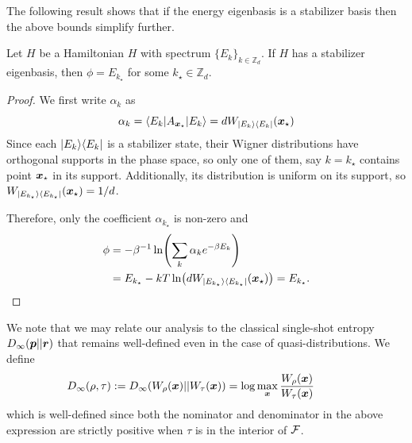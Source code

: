 \documentclass[pra,
aps,
twocolumn,
superscriptaddress,
groupedaddress,
nofootinbib,
reprint
]{revtex4-1}
\begin{document}
The following result shows that if the energy eigenbasis is a stabilizer basis then the above bounds simplify further.
\begin{proposition} \label{sharp-phi}
	Let $H$ be a Hamiltonian $H$ with spectrum $\{E_k\}_{k \in \mathbb{Z}_d}$.
	If $H$ has a stabilizer eigenbasis, then $\phi = E_{k_{\star}}$ for some $k_{\star} \in \mathbb{Z}_d$.
\end{proposition}
\begin{proof}
	We first write $\alpha_k$ as
\begin{equation}
	\alpha_k = \langle E_k | A_{\bm{x}_{\star}} |E_k\rangle = d W_{|E_k\rangle\langle E_k|}(\bm{x}_{\star})
\end{equation}
Since each $|E_k\rangle\langle E_k|$ is a stabilizer state, their Wigner distributions have orthogonal supports in the phase space, so only one of them, say $k = k_{\star}$ contains point $\bm{x}_{\star}$ in its support. 
Additionally, its distribution is uniform on its support, so $W_{|E_{k_\star}\rangle\langle E_{k_\star}|}(\bm{x}_{\star}) = 1/d$.

Therefore, only the coefficient $\alpha_{k_{\star}}$ is non-zero and
\begin{align}
\phi &= -\beta^{-1}\ln (\sum_k \alpha_k e^{-\beta E_k}) \nonumber \\
&=E_{k_{\star}} -kT \ln (d W_{|E_{k_\star}\rangle\langle E_{k_\star}|}(\bm{x}_{\star})) =E_{k_{\star}}.
\end{align}

\end{proof}

We note that we may relate our analysis to the classical single-shot entropy $D_\infty (\boldsymbol{p} ||\boldsymbol{r})$ that remains well-defined even in the case of quasi-distributions. We define 
\begin{equation}
\hspace{-1cm}D_\infty(\rho,\tau) := D_\infty(W_\rho(\x) || W_\tau (\x)) =\log  \max_{\x} \frac{W_\rho(\x)}{W_\tau(\x)}\nonumber
\end{equation}
which is well-defined since both the nominator and denominator in the above expression are strictly positive when $\tau$ is in the interior of ${\mathcal F}$.
\end{document}
